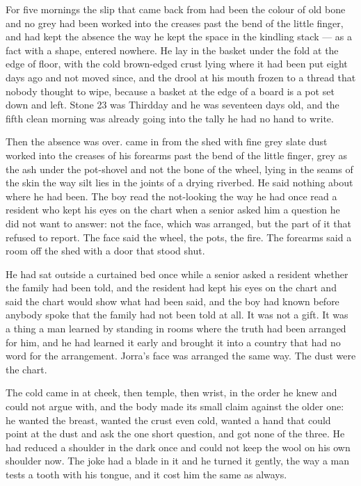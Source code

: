 
For five mornings the slip that came back from  had been the colour of old bone and no grey had been worked into the creases past the bend of the little finger, and  had kept the absence the way he kept the space in the kindling stack --- as a fact with a shape, entered nowhere. He lay in the basket under the fold at the edge of  floor, with the cold brown-edged crust lying where it had been put eight days ago and not moved since, and the drool at his mouth frozen to a thread that nobody thought to wipe, because a basket at the edge of a board is a pot set down and left. Stone 23 was Thirdday and he was seventeen days old, and the fifth clean morning was already going into the tally he had no hand to write.

Then the absence was over.  came in from the shed with fine grey slate dust worked into the creases of his forearms past the bend of the little finger, grey as the ash under the pot-shovel and not the bone of the wheel, lying in the seams of the skin the way silt lies in the joints of a drying riverbed. He said nothing about where he had been. The boy read the not-looking the way he had once read a resident who kept his eyes on the chart when a senior asked him a question he did not want to answer: not the face, which was arranged, but the part of it that refused to report. The face said the wheel, the pots, the fire. The forearms said a room off the shed with a door that stood shut.

He had sat outside a curtained bed once while a senior asked a resident whether the family had been told, and the resident had kept his eyes on the chart and said the chart would show what had been said, and the boy had known before anybody spoke that the family had not been told at all. It was not a gift. It was a thing a man learned by standing in rooms where the truth had been arranged for him, and he had learned it early and brought it into a country that had no word for the arrangement. Jorra's face was arranged the same way. The dust were the chart.

The cold came in at cheek, then temple, then wrist, in the order he knew and could not argue with, and the body made its small claim against the older one: he wanted the breast, wanted the crust even cold, wanted a hand that could point at the dust and ask the one short question, and got none of the three. He had reduced a shoulder in the dark once and could not keep the wool on his own shoulder now. The joke had a blade in it and he turned it gently, the way a man tests a tooth with his tongue, and it cost him the same as always.

